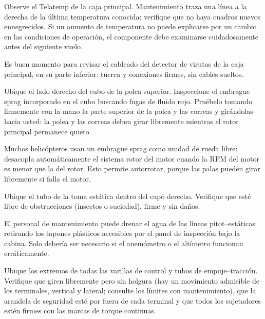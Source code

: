 Observe el Telatemp de la caja principal. Mantenimiento traza una línea a la derecha de la última temperatura conocida: verifique que no haya cuadros nuevos ennegrecidos. Si un aumento de temperatura no puede explicarse por un cambio en las condiciones de operación, el componente debe examinarse cuidadosamente antes del siguiente vuelo.

\begin{nota}
Es buen momento para revisar el cableado del detector de virutas de la caja principal, en su parte inferior: tuerca y conexiones firmes, sin cables sueltos.
\end{nota}

Ubique el lado derecho del cubo de la polea superior. Inspeccione el embrague sprag incorporado en el cubo buscando fugas de fluido rojo. Pruébelo tomando firmemente con la mano la parte superior de la polea y las correas y girándolas hacia usted: la polea y las correas deben girar libremente mientras el rotor principal permanece quieto.

\begin{nota}
Muchos helicópteros usan un embrague sprag como unidad de rueda libre: desacopla automáticamente el sistema rotor del motor cuando la RPM del motor es menor que la del rotor. Esto permite autorrotar, porque las palas pueden girar libremente si falla el motor.
\end{nota}

Ubique el tubo de la toma estática dentro del capó derecho. Verifique que esté libre de obstrucciones (insectos o suciedad), firme y sin daños.

\begin{nota}
El personal de mantenimiento puede drenar el agua de las líneas pitot--estáticas retirando los tapones plásticos accesibles por el panel de inspección bajo la cabina. Solo debería ser necesario si el anemómetro o el altímetro funcionan erráticamente.
\end{nota}

Ubique los extremos de todas las varillas de control y tubos de empuje--tracción. Verifique que giren libremente pero sin holgura (hay un movimiento admisible de los terminales, vertical y lateral; consulte los límites con mantenimiento), que la arandela de seguridad esté por fuera de cada terminal y que todos los sujetadores estén firmes con las marcas de torque continuas.

